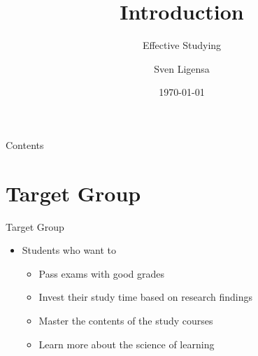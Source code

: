 \documentclass{ercisbeamer}
\title{Introduction}
\subtitle{Effective Studying}
\author{Sven Ligensa}
\institute{European Research Center for Information Systems (ERCIS)}
\date{\today}
\begin{document}
\begin{frame}
    \begin{tbox}
        \titlepage
    \end{tbox}
\end{frame}
\setbgimage{}

\begin{frame}{Contents}
    \tableofcontents
\end{frame}

\section{Target Group}
\begin{frame}{Target Group}
    \begin{itemize}
        \item Students  who want to
        \begin{itemize}
            \item Pass exams with good grades
            \item Invest their study time based on research findings
            \item Master the contents of the study courses
            \item Learn more about the science of learning
        \end{itemize}
    \end{itemize}
\end{frame}
\end{document}
